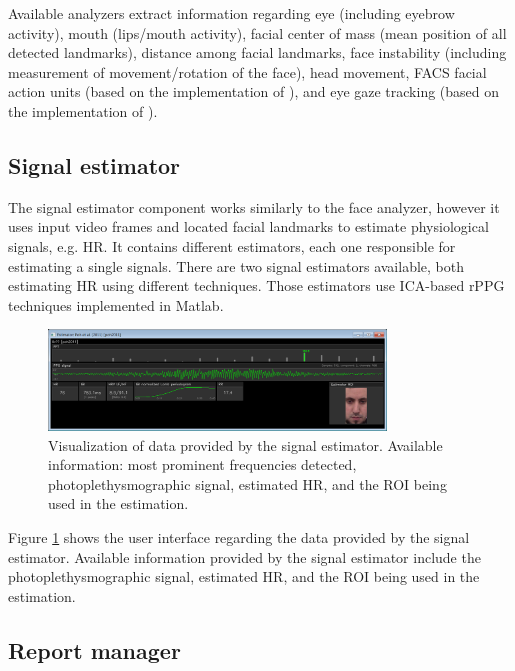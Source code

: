 Available analyzers extract information regarding eye (including eyebrow activity), mouth (lips/mouth activity), facial center of mass (mean position of all detected landmarks), distance among facial landmarks, face instability (including measurement of movement/rotation of the face), head movement, FACS facial action units (based on the implementation of \textcite{baltruvsaitis2015cross}), and eye gaze tracking (based on the implementation of \textcite{wood2015rendering}).

\subsection{Signal estimator}

The signal estimator component works similarly to the face analyzer, however it uses input video frames and located facial landmarks to estimate physiological signals, e.g. HR. It contains different estimators, each one responsible for estimating a single signals. There are two signal estimators available, both estimating HR using different techniques. Those estimators use ICA-based rPPG techniques \parencite{poh2010non,poh2011advancements} implemented in Matlab.

\begin{figure}[h]
    \centering
    \includegraphics[width=0.8\textwidth]{Content/figures/tool-ui-signal-estimator.png}
    \caption{Visualization of data provided by the signal estimator. Available information: most prominent frequencies detected, photoplethysmographic signal, estimated HR, and the ROI being used in the estimation.}
    \label{fig:tool-ui-signal-estimator}
\end{figure}

Figure \ref{fig:tool-ui-signal-estimator} shows the user interface regarding the data provided by the signal estimator. Available information provided by the signal estimator include the photoplethysmographic signal, estimated HR, and the ROI being used in the estimation.

\subsection{Report manager}

